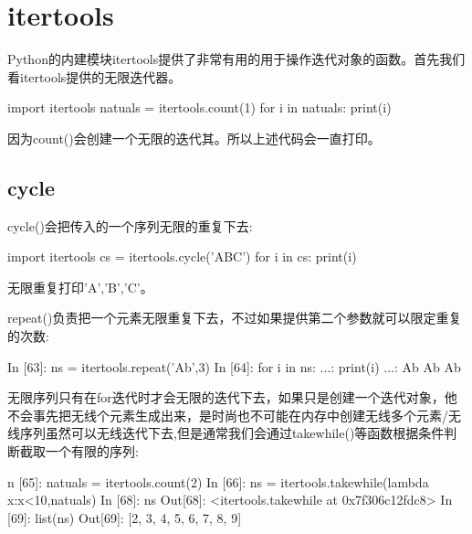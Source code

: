 \section{itertools}
Python的内建模块itertools提供了非常有用的用于操作迭代对象的函数。首先我们看itertools提供的无限迭代器。
\begin{python}
import itertools
natuals = itertools.count(1)
for i in natuals:
    print(i)
\end{python}
因为count()会创建一个无限的迭代其。所以上述代码会一直打印。

\subsection{cycle}
cycle()会把传入的一个序列无限的重复下去:
\begin{python}
import itertools
cs = itertools.cycle('ABC')
for i in cs:
    print(i)
\end{python}
无限重复打印'A','B','C'。

repeat()负责把一个元素无限重复下去，不过如果提供第二个参数就可以限定重复的次数:
\begin{python}
In [63]: ns = itertools.repeat('Ab',3)
In [64]: for i in ns:
    ...:     print(i)
        ...:     
	Ab
	Ab
	Ab
\end{python}
无限序列只有在for迭代时才会无限的迭代下去，如果只是创建一个迭代对象，他不会事先把无线个元素生成出来，是时尚也不可能在内存中创建无线多个元素/无线序列虽然可以无线迭代下去,但是通常我们会通过takewhile()等函数根据条件判断截取一个有限的序列:
\begin{python}
n [65]: natuals = itertools.count(2)
In [66]: ns = itertools.takewhile(lambda x:x<10,natuals)
In [68]: ns
Out[68]: <itertools.takewhile at 0x7f306c12fdc8>
In [69]: list(ns)
Out[69]: [2, 3, 4, 5, 6, 7, 8, 9]
\end{python}
